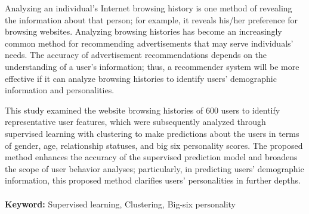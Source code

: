 \begin{abstracten}
\hspace*{8mm} Analyzing an individual’s Internet browsing history is one method of revealing the information about that person; for example, it reveals his/her preference for browsing websites. Analyzing browsing histories has become an increasingly common method for recommending advertisements that may serve individuals’ needs. The accuracy of advertisement recommendations depends on the understanding of a user’s information; thus, a recommender system will be more effective if it can analyze browsing histories to identify users’ demographic information and personalities.\par

This study examined the website browsing histories of 600 users to identify representative user features, which were subsequently analyzed through supervised learning with clustering to make predictions about the users in terms of gender, age, relationship statuses, and big six personality scores. The proposed method enhances the accuracy of the supervised prediction model and broadens the scope of user behavior analyses; particularly, in predicting users’ demographic information, this proposed method clarifies users’ personalities in further depths.\\
\\
{\bf Keyword: }Supervised learning, Clustering, Big-six personality
\end{abstracten} 

